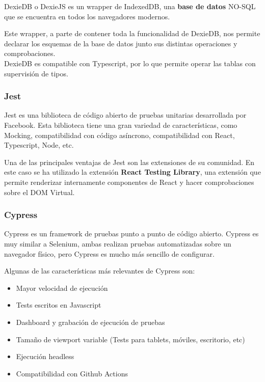 DexieDB o DexieJS es un wrapper de IndexedDB, una \textbf{base de datos} NO-SQL
que se encuentra en todos los navegadores modernos.

Este wrapper, a parte de contener toda la funcionalidad de DexieDB, nos
permite declarar los esquemas de la base de datos junto sus distintas
operaciones y comprobaciones.\\
DexieDB es compatible con Typescript, por lo que permite operar las
tablas con supervisión de tipos.

\hypertarget{jest}{%
\subsubsection{Jest}\label{jest}}

Jest es una biblioteca de código abierto de pruebas unitarias
desarrollada por Facebook. Esta biblioteca tiene una gran variedad de
características, como Mocking, compatibilidad con código asíncrono,
compatibilidad con React, Typescript, Node, etc.

Una de las principales ventajas de Jest son las extensiones de su
comunidad. En este caso se ha utilizado la extensión \textbf{React
Testing Library}, una extensión que permite renderizar internamente
componentes de React y hacer comprobaciones sobre el DOM Virtual.

\hypertarget{section}{%
\subsubsection{}\label{section}}

\hypertarget{cypress}{%
\subsubsection{Cypress}\label{cypress}}

Cypress es un framework de pruebas punto a punto de código abierto.
Cypress es muy similar a Selenium, ambas realizan pruebas automatizadas
sobre un navegador físico, pero Cypress es mucho más sencillo de
configurar.

Algunas de las características más relevantes de Cypress son:

\begin{itemize}
\item
  Mayor velocidad de ejecución
\item
  Tests escritos en Javascript
\item
  Dashboard y grabación de ejecución de pruebas
\item
  Tamaño de viewport variable (Tests para tablets, móviles, escritorio,
  etc)
\item
  Ejecución headless
\item
  Compatibilidad con Github Actions
\end{itemize}

